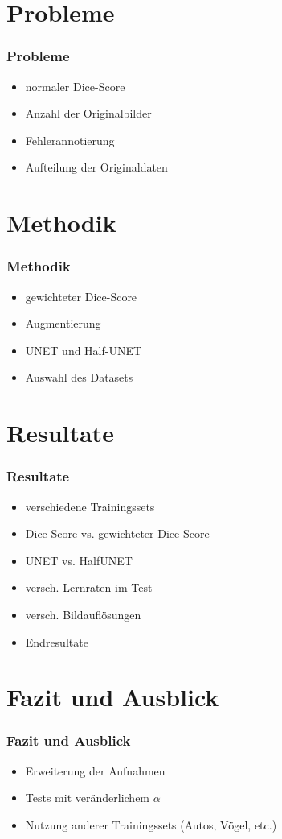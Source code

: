 \documentclass{beamer}
\begin{document}
\section{Probleme}
\begin{frame}
\frametitle{Probleme}
\begin{itemize}
    \item normaler Dice-Score
    \item Anzahl der Originalbilder
    \item Fehlerannotierung
    \item Aufteilung der Originaldaten
\end{itemize}
\end{frame}

\section{Methodik}
\begin{frame}
\frametitle{Methodik}
\begin{itemize}
    \item gewichteter Dice-Score
    \item Augmentierung
    \item UNET und Half-UNET
    \item Auswahl des Datasets
\end{itemize}
\end{frame}

\section{Resultate}
\begin{frame}
\frametitle{Resultate}
\begin{itemize}
    \item verschiedene Trainingssets
    \item Dice-Score vs. gewichteter Dice-Score
    \item UNET vs. HalfUNET
    \item versch. Lernraten im Test
    \item versch. Bildauflösungen
    \item Endresultate
\end{itemize}
\end{frame}

\section{Fazit und Ausblick}
\begin{frame}
\frametitle{Fazit und Ausblick}
\begin{itemize}
    \item Erweiterung der Aufnahmen
    \item Tests mit veränderlichem $\alpha$
    \item Nutzung anderer Trainingssets (Autos, Vögel, etc.)
\end{itemize}
\end{frame}
\end{document}
